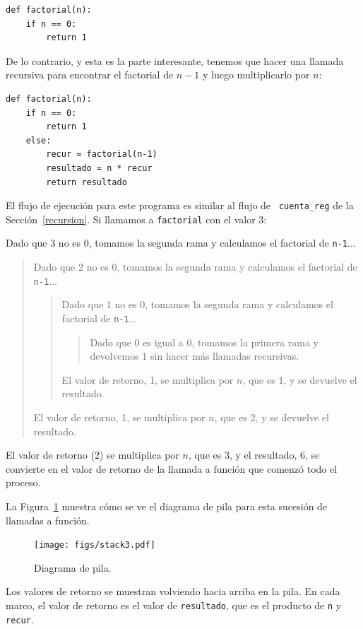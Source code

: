 \documentclass[10pt]{book}
\begin{document}
\begin{verbatim}
def factorial(n):
    if n == 0:
        return 1
\end{verbatim}
%
De lo contrario, y esta es la parte interesante, tenemos que hacer una
llamada recursiva para encontrar el factorial de $n-1$ y luego multiplicarlo por
$n$:

\begin{verbatim}
def factorial(n):
    if n == 0:
        return 1
    else:
        recur = factorial(n-1)
        resultado = n * recur
        return resultado
\end{verbatim}
%
El flujo de ejecución para este programa es similar al flujo de {\tt
cuenta\_reg} de la Sección~\ref{recursion}.  Si llamamos a {\tt factorial}
con el valor 3:

Dado que 3 no es 0, tomamos la segunda rama y calculamos el factorial
de {\tt n-1}...

\begin{quote}
Dado que 2 no es 0, tomamos la segunda rama y calculamos el factorial de
{\tt n-1}...


  \begin{quote}
  Dado que 1 no es 0, tomamos la segunda rama y calculamos el factorial
  de {\tt n-1}...


    \begin{quote}
    Dado que 0 es igual a 0, tomamos la primera rama y devolvemos 1
    sin hacer más llamadas recursivas.
    \end{quote}


  El valor de retorno, 1, se multiplica por $n$, que es 1, y se
  devuelve el resultado.
  \end{quote}


El valor de retorno, 1, se multiplica por $n$, que es 2, y se
devuelve el resultado.
\end{quote}


El valor de retorno (2) se multiplica por $n$, que es 3, y el resultado, 6,
se convierte en el valor de retorno de la llamada a función que comenzó todo
el proceso.

La Figura~\ref{fig.stack3} muestra cómo se ve el diagrama de pila
para esta sucesión de llamadas a función.

\begin{figure}
\centerline
{\texttt{[image: figs/stack3.pdf]}}
\caption{Diagrama de pila.}
\label{fig.stack3}
\end{figure}

Los valores de retorno se muestran volviendo hacia arriba en la pila.  En cada
marco, el valor de retorno es el valor de {\tt resultado}, que es el
producto de {\tt n} y {\tt recur}.
\end{document}
